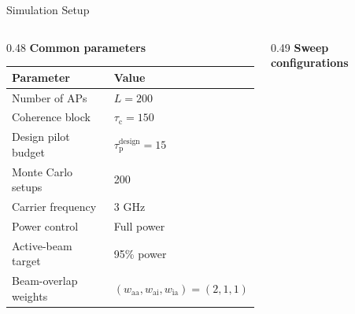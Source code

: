 \documentclass[10pt,aspectratio=169]{beamer}
\newcommand{\tauc}{\tau_{\mathrm{c}}}
\newcommand{\taudesign}{\tau_{\mathrm{p}}^{\mathrm{design}}}
\newcommand{\waa}{w_{\mathrm{aa}}}
\newcommand{\wai}{w_{\mathrm{ai}}}
\newcommand{\wia}{w_{\mathrm{ia}}}
\begin{document}
\begin{frame}{Simulation Setup}
    \small
    \vspace{-0.25em}
    \begin{columns}[T,onlytextwidth]
        \begin{column}{0.48\textwidth}
            \textbf{Common parameters}
            \vspace{0.25em}
            
            \scriptsize
            \begin{tabular}{@{}ll@{}}
                \toprule
                Parameter            & Value                        \\
                \midrule
                Number of APs        & \(L=200\)                    \\
                Coherence block      & \(\tauc=150\)                \\
                Design pilot budget  & \(\taudesign=15\)            \\
                Monte Carlo setups   & 200                          \\
                Carrier frequency    & 3 GHz                        \\
                Power control        & Full power                   \\
                Active-beam target   & 95\% power                   \\
                Beam-overlap weights & \((\waa,\wai,\wia)=(2,1,1)\) \\
                \bottomrule
            \end{tabular}
        \end{column}
        \begin{column}{0.49\textwidth}
            \textbf{Sweep configurations}
            \vspace{0.25em}
            

\end{column}
\end{columns}
\end{frame}
\end{document}
